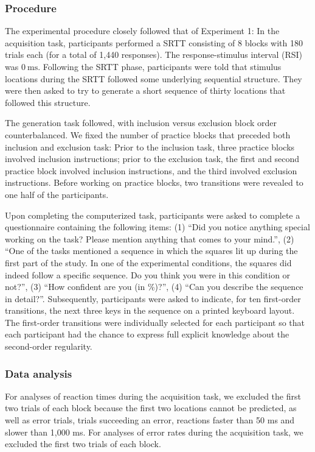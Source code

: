 \documentclass[jou]{apa6}
\theoremstyle{definition}
\theoremstyle{definition}
\theoremstyle{definition}
\theoremstyle{remark}
\begin{document}
\subsubsection{Procedure}\label{procedure-2}

The experimental procedure closely followed that of Experiment 1: In the
acquisition task, participants performed a SRTT consisting of 8 blocks
with 180 trials each (for a total of 1,440 responses). The
response-stimulus interval (RSI) was \(0~\text{ms}\). Following the SRTT
phase, participants were told that stimulus locations during the SRTT
followed some underlying sequential structure. They were then asked to
try to generate a short sequence of thirty locations that followed this
structure.

The generation task followed, with inclusion versus exclusion block
order counterbalanced. We fixed the number of practice blocks that
preceded both inclusion and exclusion task: Prior to the inclusion task,
three practice blocks involved inclusion instructions; prior to the
exclusion task, the first and second practice block involved inclusion
instructions, and the third involved exclusion instructions. Before
working on practice blocks, two transitions were revealed to one half of
the participants.

Upon completing the computerized task, participants were asked to
complete a questionnaire containing the following items: (1)
\enquote{Did you notice anything special working on the task? Please
mention anything that comes to your mind.}, (2) \enquote{One of the
tasks mentioned a sequence in which the squares lit up during the first
part of the study. In one of the experimental conditions, the squares
did indeed follow a specific sequence. Do you think you were in this
condition or not?}, (3) \enquote{How confident are you (in \%)?}, (4)
\enquote{Can you describe the sequence in detail?}. Subsequently,
participants were asked to indicate, for ten first-order transitions,
the next three keys in the sequence on a printed keyboard layout. The
first-order transitions were individually selected for each participant
so that each participant had the chance to express full explicit
knowledge about the second-order regularity.

\subsubsection{Data analysis}\label{data-analysis-2}

For analyses of reaction times during the acquisition task, we excluded
the first two trials of each block because the first two locations
cannot be predicted, as well as error trials, trials succeeding an
error, reactions faster than 50 ms and slower than 1,000 ms. For
analyses of error rates during the acquisition task, we excluded the
first two trials of each block.
\end{document}
